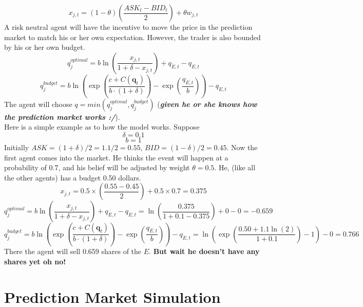 \documentclass{article}
\begin{document}
\begin{displaymath}
    x_{j,t}=(1-\theta)(\frac{ASK_t-BID_t}{2})+\theta w_{j,t}
\end{displaymath}
A risk neutral agent will have the incentive to move the price in the prediction market to match his or her own expectation. However, the trader is also bounded by his or her own budget.
\begin{displaymath}
    q_j^{optimal}=b\ln({\frac{x_{j,t}}{1+\delta-x_{j,t}}})+q_{\overline{E},t}-q_{E,t}
\end{displaymath}
\begin{displaymath}
    q_j^{budget}=b\ln({\exp(\frac{c+C(\textbf{q}_t)}{b\cdot (1+\delta)})-\exp(\frac{q_{\overline{{E},t}}}{b})})-q_{E,t}
\end{displaymath}
The agent will choose $q=min(q_j^{optimal}, q_j^{budget})$ (\textbf{\emph{given he or she knows how the prediction market works :/}}). \\
Here is a simple example as to how the model works. Suppose
\begin{displaymath}
    \delta = 0.1
\end{displaymath}
\begin{displaymath}
    b = 1
\end{displaymath}
Initially $ASK=(1+\delta)/2=1.1/2=0.55$, $BID=(1-\delta)/2=0.45$.
Now the first agent comes into the market. He thinks the event will happen at a probability of 0.7, and his belief will be adjusted by weight $\theta=0.5$. He, (like all the other agents) has a budget 0.50 dollars.
\begin{displaymath}
    x_{j,t}=0.5\times (\frac{0.55-0.45}{2})+0.5\times 0.7=0.375
\end{displaymath}
\begin{displaymath}
    q_j^{optimal}=b\ln({\frac{x_{j,t}}{1+\delta-x_{j,t}}})+q_{\overline{E},t}-q_{E,t}=\ln({\frac{0.375}{1+0.1-0.375}})+0-0=-0.659
\end{displaymath}
\begin{displaymath}
    q_j^{budget}=b\ln({\exp(\frac{c+C(\textbf{q}_t)}{b\cdot (1+\delta)})-\exp(\frac{q_{\overline{{E}},t}}{b})})-q_{E,t}=\ln({\exp(\frac{0.50+1.1\ln(2)}{1+0.1})-1})-0=0.766
\end{displaymath}
There the agent will sell 0.659 shares of the $E$. \textbf{But wait he doesn't have any shares yet oh no!}

\section{Prediction Market Simulation}
\end{document}
